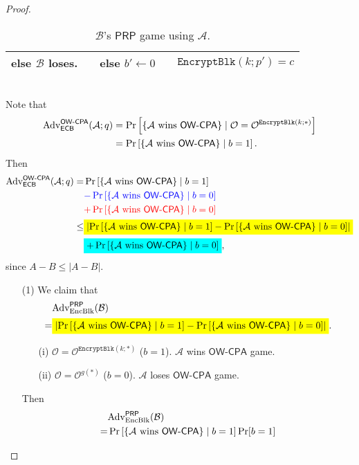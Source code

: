 \documentclass[12pt,openany]{book}
\newcommand{\mathcolorbox}[2]{\colorbox{#1}{$\displaystyle #2$}}
\theoremstyle{definition}
\newcommand{\set}[1]{\left\{#1\right\}}
\newcommand{\abs}[1]{\left\lvert #1 \right\rvert}
\newcommand{\A}{\mathcal{A}}
\newcommand{\oracle}{\mathcal{O}}
\newcommand{\OW}{\mathsf{OW}}
\newcommand{\PRP}{\mathsf{PRP}}
\newcommand{\CPA}{\mathsf{CPA}}
\newcommand{\ECB}{\mathsf{ECB}}
\newcommand{\EncryptBlk}{\mathtt{EncryptBlk}}
\newcommand{\Adv}{\textnormal{Adv}}
\begin{document}
\begin{proof}
\begin{table}[h]
\begin{tabular}{ccccc}
				else $\mathcal{B}$ loses. & & else $b'\gets 0$ & & $\EncryptBlk(k;p')=c$\\
				\bottomrule[1.5pt]
			\end{tabular}
			\caption{$\mathcal{B}$'s $\PRP$ game using $\A$.}
		\end{table}\\
		Note that \begin{align*}
			\Adv_{\ECB}^{\OW\text{-}\CPA}(\A;q)&=\Pr\left[\set{\text{$\A$ wins $\OW$-$\CPA$}}\mid\oracle=\oracle^{\EncryptBlk(k;*)}\right]\\
			&=\Pr\left[\set{\text{$\A$ wins $\OW$-$\CPA$}}\mid b=1\right].
		\end{align*}
		Then \begin{align*}
			\Adv_{\ECB}^{\OW\text{-}\CPA}(\A;q)
			=&\Pr\left[\set{\text{$\A$ wins $\OW$-$\CPA$}}\mid b=1\right]\\
			&\textcolor{blue}{-\Pr\left[\set{\text{$\A$ wins $\OW$-$\CPA$}}\mid b=0\right]}\\
			&\textcolor{red}{+\Pr\left[\set{\text{$\A$ wins $\OW$-$\CPA$}}\mid b=0\right]}\\
			\leq&\mathcolorbox{-blue}{\abs{\Pr\left[\set{\text{$\A$ wins $\OW$-$\CPA$}}\mid b=1\right]-\Pr\left[\set{\text{$\A$ wins $\OW$-$\CPA$}}\mid b=0\right]}}\\
			&\mathcolorbox{-red}{+\Pr\left[\set{\text{$\A$ wins $\OW$-$\CPA$}}\mid b=0\right]},
		\end{align*} since $A-B\leq\abs{A-B}$.
		\begin{enumerate}
			\item[(1)] We claim that \begin{align*}
				&\Adv_{\textnormal{EncBlk}}^{\PRP}(\mathcal{B})\\
				=&\mathcolorbox{-blue}{\abs{\Pr\left[\set{\text{$\A$ wins $\OW$-$\CPA$}}\mid b=1\right]-\Pr\left[\set{\text{$\A$ wins $\OW$-$\CPA$}}\mid b=0\right]}}.
			\end{align*}
			\begin{enumerate}
				\item[(i)] $\oracle=\oracle^{\EncryptBlk(k;*)}$ ($b=1$). $\A$ wins $\OW$-$\CPA$ game.
				\item[(ii)] $\oracle=\oracle^{g(*)}$ ($b=0$). $\A$ loses $\OW$-$\CPA$ game.
			\end{enumerate} Then \begin{align*}
				&\Adv_{\textnormal{EncBlk}}^{\PRP}(\mathcal{B})\\
				=&\Pr\left[\set{\text{$\A$ wins $\OW$-$\CPA$}}\mid b=1\right]\Pr[b=1]\\

\end{align*}
\end{enumerate}
\end{proof}
\end{document}
